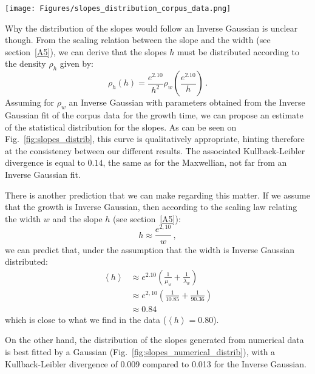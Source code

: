 \documentclass[12pt,twocolumn,amsmath,amssymb,aps,longbibliography]{revtex4-1}  %
\begin{document}
\begin{figure*}[!bp]
  \centering
  \texttt{[image: Figures/slopes\_distribution\_corpus\_data.png]}
  \caption{Several fits of the distribution of the slopes as extracted from corpus data.}
  \label{fig:slopes_distrib}
\end{figure*}

Why the distribution of the slopes would follow an Inverse Gaussian is unclear though. From the scaling relation between the slope and the width (see section~\ref{A5}), we can derive that the slopes $h$ must be distributed according to the density $\rho_h$ given by:
\begin{equation}
\rho_h(h) = \frac{e^{2.10}}{h^2} \rho_w\left( \frac{e^{2.10}}{h} \right) \, .
\end{equation}
Assuming for $\rho_w$ an Inverse Gaussian with parameters obtained from the Inverse Gaussian fit of the corpus data for the growth time, we can propose an estimate of the statistical distribution for the slopes. As can be seen on Fig.~\ref{fig:slopes_distrib}, this curve is qualitatively appropriate, hinting therefore at the consistency between our different results. The associated Kullback-Leibler divergence is equal to $0.14$, the same as for the Maxwellian, not far from an Inverse Gaussian fit. 

There is another prediction that we can make regarding this matter. If we assume that the growth is Inverse Gaussian, then according to the scaling law relating the width $w$ and the slope $h$ (see section~\ref{A5}):
\begin{equation}
h \approx \frac{e^{2,10}}{w} \, ,
\end{equation}
we can predict that, under the assumption that the width is Inverse Gaussian distributed:
\begin{equation}
\begin{split}
\left< h \right > &\approx e^{2.10}\left( \frac{1}{\mu_{w}} + \frac{1}{\lambda_w} \right) \\
&\approx e^{2,10}\left( \frac{1}{10.85} + \frac{1}{90.36} \right) \\
& \approx 0.84 
\end{split}
\end{equation}
which is close to what we find in the data ($\left< h \right > = 0.80$).

On the other hand, the distribution of the slopes generated from numerical data is best fitted by a Gaussian (Fig.~\ref{fig:slopes_numerical_distrib}), with a Kullback-Leibler divergence of 0.009 compared to 0.013 for the Inverse Gaussian.
\end{document}
